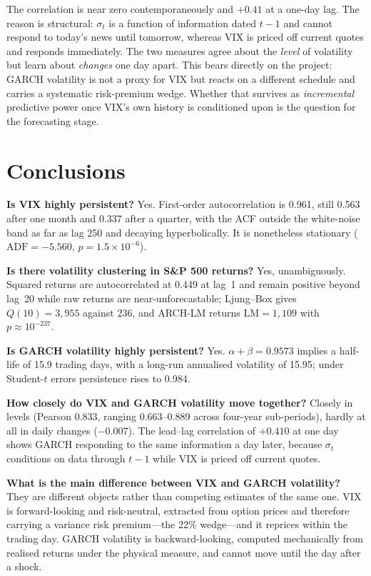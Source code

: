 \documentclass[10pt,a4paper]{article}
\begin{document}
\noindent
The correlation is near zero contemporaneously and $+0.41$ at a one-day lag. The reason is
structural: $\sigma_t$ is a function of information dated $t-1$ and cannot respond to
today's news until tomorrow, whereas VIX is priced off current quotes and responds
immediately. The two measures agree about the \emph{level} of volatility but learn about
\emph{changes} one day apart. This bears directly on the project: GARCH volatility is not
a proxy for VIX but reacts on a different schedule and carries a systematic risk-premium
wedge. Whether that survives as \emph{incremental} predictive power once VIX's own history
is conditioned upon is the question for the forecasting stage.

\section{Conclusions}

\textbf{Is VIX highly persistent?} Yes. First-order autocorrelation is 0.961, still 0.563
after one month and 0.337 after a quarter, with the ACF outside the white-noise band as
far as lag 250 and decaying hyperbolically. It is nonetheless stationary
($\text{ADF} = -5.560$, $p = 1.5\times10^{-6}$).

\textbf{Is there volatility clustering in S\&P 500 returns?} Yes, unambiguously. Squared
returns are autocorrelated at 0.449 at lag~1 and remain positive beyond lag~20 while raw
returns are near-unforecastable; Ljung--Box gives $Q(10) = 3{,}955$ against 236, and
ARCH-LM returns $\text{LM} = 1{,}109$ with $p \approx 10^{-237}$.

\textbf{Is GARCH volatility highly persistent?} Yes. $\alpha+\beta = 0.9573$ implies a
half-life of 15.9 trading days, with a long-run annualised volatility of 15.95; under
Student-$t$ errors persistence rises to 0.984.

\textbf{How closely do VIX and GARCH volatility move together?} Closely in levels
(Pearson 0.833, ranging 0.663--0.889 across four-year sub-periods), hardly at all in
daily changes ($-0.007$). The lead--lag correlation of
$+0.410$ at one day shows GARCH responding to the same information a day later, because
$\sigma_t$ conditions on data through $t-1$ while VIX is priced off current quotes.

\textbf{What is the main difference between VIX and GARCH volatility?} They are different
objects rather than competing estimates of the same one. VIX is forward-looking and
risk-neutral, extracted from option prices and therefore carrying a variance risk
premium---the 22\% wedge---and it reprices within the trading day. GARCH volatility is
backward-looking, computed mechanically from realised returns under the physical measure,
and cannot move until the day after a shock.
\end{document}
